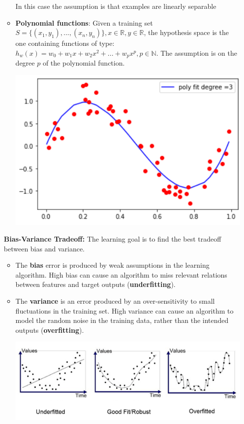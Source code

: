 \begin{itemize}
\begin{itemize}
    In this case the assumption is that examples are linearly separable
    
    \item \textbf{Polynomial functions}:
    Given a training set $S = \{(x_{1},y_{1}),...,(x_{n}, y_{n})\}, x\in \mathbb{R}, y\in \mathbb{R}$, the hypothesis space is the one containing functions of type: $h_{w}(x) = w_{0} + w_{1}x + w_{2}x^{2} + ... + w_{p}x^{p}, p\in \mathbb{N}$. The assumption is on the degree $p$ of the polynomial function.
    \begin{center}
        \includegraphics{images/Poly reg.png}
    \end{center}
\end{itemize}
\textbf{Bias-Variance Tradeoff:}
The learning goal is to find the best tradeoff between bias and variance.
\begin{itemize}
    \item The \textbf{bias} error is produced by weak assumptions in the learning algorithm. High bias can cause an algorithm to miss relevant relations between features and target outputs (\textbf{underfitting}).
    \item The \textbf{variance} is an error produced by an over-sensitivity to small fluctuations in the training set. High variance can cause an algorithm to model the random noise in the training data, rather than the intended outputs (\textbf{overfitting}).
    \begin{center}
        \includegraphics[scale = 0.35]{images/Overfitting vs Underfitting.png}
    \end{center}
\end{itemize}
\end{itemize}

